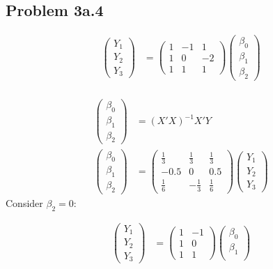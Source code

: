 \documentclass[a4paper]{article}
\begin{document}
\subsection*{Problem 3a.4}
\begin{align*}
\begin{pmatrix}Y_1\\Y_2\\Y_3
\end{pmatrix}&= \begin{pmatrix}1 &-1 &1\\ 1 & 0 & -2\\ 1 & 1 &1\end{pmatrix}\begin{pmatrix}\beta_0\\ \beta_1 \\ \beta_2\end{pmatrix}\\
\end{align*}

\begin{align*}
\begin{pmatrix}\beta_0\\ \beta_1 \\ \beta_2\end{pmatrix}&= (X'X)^{-1}X'Y\\
\begin{pmatrix}\beta_0\\ \beta_1 \\ \beta_2\end{pmatrix}&= \begin{pmatrix}\frac{1}{3} & \frac{1}{3} & \frac{1}{3}\\ -0.5 & 0 & 0.5\\ \frac{1}{6} & -\frac{1}{3} & \frac{1}{6}\end{pmatrix}\begin{pmatrix}Y_1\\Y_2\\Y_3
\end{pmatrix}
\end{align*}
Consider $\beta_2=0$:


\begin{align*}
\begin{pmatrix}Y_1\\Y_2\\Y_3
\end{pmatrix}&= \begin{pmatrix}1 &-1 \\ 1 & 0 \\ 1 & 1\end{pmatrix}\begin{pmatrix}\beta_0\\ \beta_1 \\\end{pmatrix}\\
\end{align*}
\end{document}
